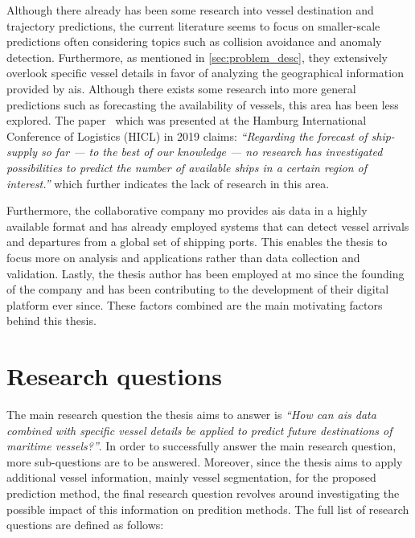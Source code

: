 Although there already has been some research into vessel destination and trajectory predictions, the current literature seems to focus on smaller-scale predictions often considering topics such as collision avoidance and anomaly detection. Furthermore, as mentioned in \cref{sec:problem_desc}, they extensively overlook specific vessel details in favor of analyzing the geographical information provided by \acrshort{ais}. Although there exists some research into more general predictions such as forecasting the availability of vessels, this area has been less explored. The paper~\cite{lechtenberg2019} which was presented at the Hamburg International Conference of Logistics (HICL) in 2019 claims: \textit{“Regarding the forecast of ship-supply so far --- to the best of our knowledge --- no research has investigated possibilities to predict the number of available ships in a certain region of interest.”} which further indicates the lack of research in this area.

Furthermore, the collaborative company \acrfull{mo} provides \acrshort{ais} data in a highly available format and has already employed systems that can detect vessel arrivals and departures from a global set of shipping ports. This enables the thesis to focus more on analysis and applications rather than data collection and validation. Lastly, the thesis author has been employed at \acrshort{mo} since the founding of the company and has been contributing to the development of their digital platform ever since. These factors combined are the main motivating factors behind this thesis.

\section{Research questions}
\label{sec:research_questions}

The main research question the thesis aims to answer is \textit{``How can \acrshort{ais} data combined with specific vessel details be applied to predict future destinations of maritime vessels?''}. In order to successfully answer the main research question, more sub-questions are to be answered. Moreover, since the thesis aims to apply additional vessel information, mainly vessel segmentation, for the proposed prediction method, the final research question revolves around investigating the possible impact of this information on predition methods. The full list of research questions are defined as follows:

